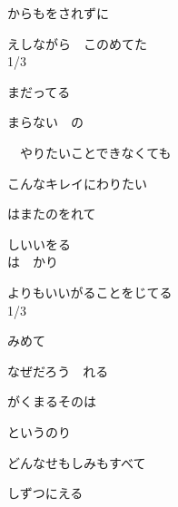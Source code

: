 からもをされずに

えしながら　このめてた
\\

1/3

まだってる

まらない　の

　やりたいことできなくても

こんなキレイにわりたい

はまたのをれて

しいいをる
\\

は　かり

よりもいいがることをじてる
\\

1/3

みめて

なぜだろう　れる

がくまるそのは

というのり

どんなせもしみもすべて

しずつにえる
\\
